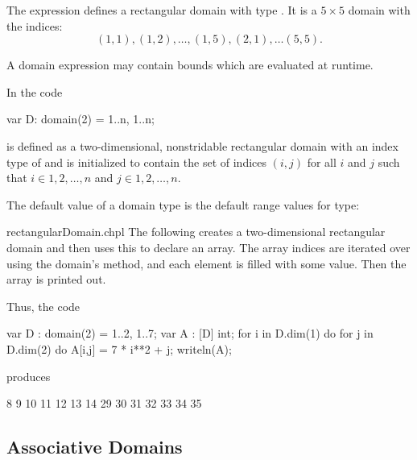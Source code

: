 \begin{example}
The expression  defines a rectangular domain with
type   .
It is a $5 \times 5$ domain with the indices:
\begin{equation}
(1, 1), (1, 2), \ldots, (1, 5), (2, 1), \ldots (5, 5).
\end{equation}
\end{example}

A domain expression may contain bounds which are evaluated at runtime.
\begin{example}
In the code
\begin{chapel}
var D: domain(2) = {1..n, 1..n};
\end{chapel}

 is defined as a two-dimensional, nonstridable rectangular
domain with an index type of  and is initialized to
contain the set of indices $(i,j)$ for all $i$ and $j$ such that
$i \in {1, 2, \ldots, n}$ and $j \in {1, 2, \ldots, n}$.
\end{example}


The default value of a domain type is the  default range
values for type:
\begin{quote}
\end{quote}

\begin{chapelexample}{rectangularDomain.chpl}
The following creates a two-dimensional rectangular domain and then uses this to
declare an array.  The array indices are iterated over using the domain's
 method, and each element is filled with
some value.  Then the array is printed out.

Thus, the code
\begin{chapel}
var D : domain(2) = {1..2, 1..7};
var A : [D] int;
for i in D.dim(1) do
  for j in D.dim(2) do
    A[i,j] = 7 * i**2 + j;
writeln(A);
\end{chapel}
produces
\begin{chapelprintoutput}{}
8 9 10 11 12 13 14
29 30 31 32 33 34 35
\end{chapelprintoutput}
\end{chapelexample}

\subsection{Associative Domains}

